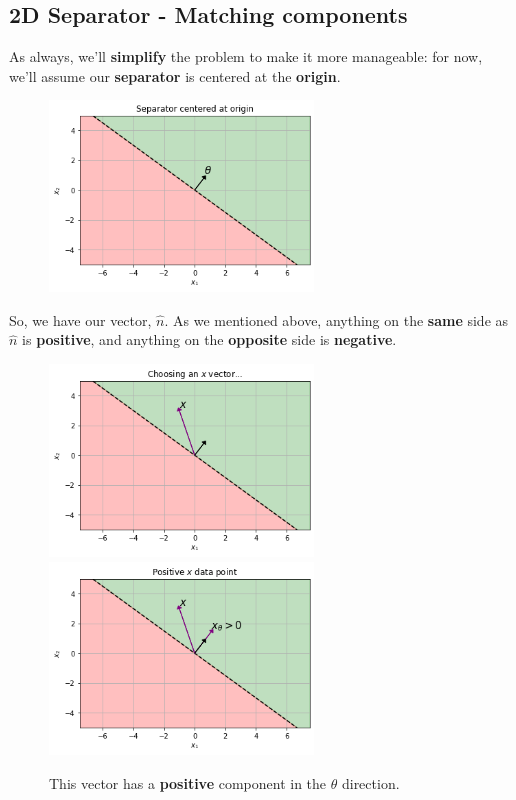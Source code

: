     \subsection{2D Separator - Matching components}
    
        As always, we'll \textbf{simplify} the problem to make it more manageable: for now, we'll assume our \textbf{separator} is centered at the \textbf{origin}.
        
        \begin{figure}[H]
            \centering
                \includegraphics[width=70mm,scale=0.5]{images/classification_images/separator_centered_at_origin.png}
        \end{figure}
        
        So, we have our vector, $\hat{n}$. As we mentioned above, anything on the \textbf{same} side as $\hat{n}$ is \textbf{positive}, and anything on the \textbf{opposite} side is \textbf{negative}.
            \\
            
        \begin{figure}[H]
                \includegraphics[width=70mm,scale=0.5]{images/classification_images/chose_a_vector.png}
                \includegraphics[width=70mm,scale=0.5]{images/classification_images/positive_v_vector.png}
                
                \caption*{This vector has a \textbf{positive} component in the $\theta$ direction.}
        \end{figure}
        

